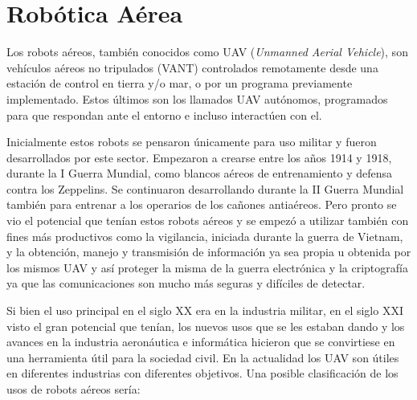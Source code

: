 \section{Robótica Aérea}
\hspace{1cm} Los robots aéreos, también conocidos como UAV (\textit{Unmanned Aerial Vehicle}), son vehículos aéreos no tripulados (VANT) controlados remotamente desde una estación de control en tierra y/o mar, o por un programa previamente implementado. Estos últimos son los llamados UAV autónomos, programados para que respondan ante el entorno e incluso interactúen con el.

\hspace{1cm} Inicialmente estos robots se pensaron únicamente para uso militar y fueron desarrollados por este sector. Empezaron a crearse entre los años 1914 y 1918, durante la I Guerra Mundial, como blancos aéreos de entrenamiento y defensa contra los Zeppelins. Se continuaron desarrollando durante la II Guerra Mundial también para entrenar a los operarios de los cañones antiaéreos. Pero pronto se vio el potencial que tenían estos robots aéreos y se empezó a utilizar también con fines más productivos como la vigilancia, iniciada durante la guerra de Vietnam,  y la obtención, manejo y transmisión de información ya sea propia u obtenida por los mismos UAV y así proteger la misma de la guerra electrónica y la criptografía ya que las comunicaciones son mucho más seguras y difíciles de detectar.

\hspace{1cm} Si bien el uso principal en el siglo XX era en la industria militar, en el siglo XXI visto el gran potencial que tenían, los nuevos usos que se les estaban dando y los avances en  la industria aeronáutica e informática hicieron que se convirtiese en una herramienta útil para la sociedad civil. En la actualidad los UAV son útiles en diferentes industrias con diferentes objetivos. Una posible clasificación de los usos de robots aéreos sería:

